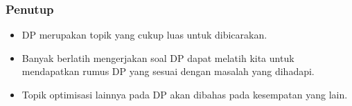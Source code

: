 \begin{frame}
\frametitle{Penutup}
\begin{itemize}
  \item DP merupakan topik yang cukup luas untuk dibicarakan.
  \item Banyak berlatih mengerjakan soal DP dapat melatih kita untuk mendapatkan rumus DP yang sesuai dengan masalah yang dihadapi.
  \item Topik optimisasi lainnya pada DP akan dibahas pada kesempatan yang lain.  
\end{itemize}
\end{frame}


